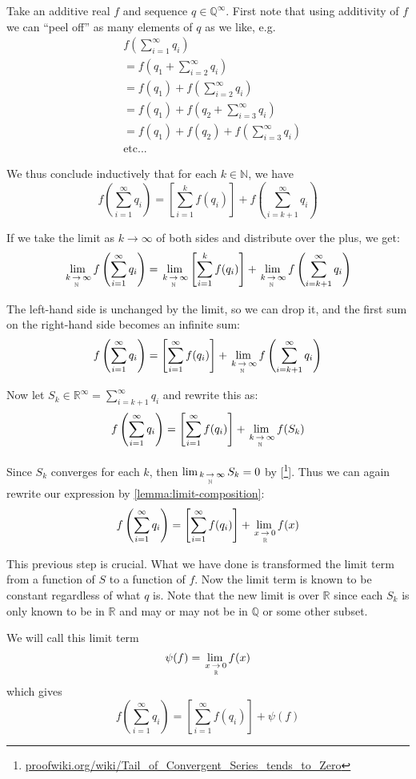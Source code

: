\documentclass{article}
\theoremstyle{mytheoremstyle}
\renewenvironment{proof}[1][\proofname]{\noindent{\bfseries #1. }}{\begin{flushright}\smiley\end{flushright}}
\newcommand{\R}{\mathbb R}
\newcommand{\N}{\mathbb Z}
\newcommand{\Q}{\mathbb Q}
\renewcommand{\N}{\mathbb N}
\begin{document}
\begin{proof}
Take an additive real $f$ and sequence $q \in \mathbb Q ^\infty$. First note that using additivity of $f$ we can ``peel off'' as many elements of $q$ as we like, e.g.
\begin{align*}
    & f\left( \sum_{i = 1}^\infty q_i \right) \\
    &= f\left( q_1 + \sum_{i = 2}^\infty q_i \right) \\
    &= f(q_1) + f\left( \sum_{i = 2}^\infty q_i \right) \\
    &= f(q_1) + f\left( q_2 + \sum_{i = 3}^\infty q_i \right) \\
    &= f(q_1) + f(q_2) + f\left( \sum_{i = 3}^\infty q_i \right) \\
    &\text{etc...}
\end{align*}

We thus conclude inductively that for each $k \in \mathbb N$, we have
$$ f\left( \sum_{i = 1}^\infty q_i \right) = \left[ \sum_{i=1}^k f(q_i) \right] + f\left( \sum_{i = k+1}^\infty q_i \right) $$

If we take the limit as $k \to \infty$ of both sides and distribute over the plus, we get:
$$ \limx{\N}{k}{\infty} f\left( \sum_{i = 1}^\infty q_i \right) = \limx{\N}{k}{\infty} \left[ \sum_{i=1}^k f(q_i) \right] + \limx{\N}{k}{\infty} f\left( \sum_{i = k+1}^\infty q_i \right) $$

The left-hand side is unchanged by the limit, so we can drop it, and the first sum on the right-hand side becomes an infinite sum:
$$ f\left( \sum_{i = 1}^\infty q_i \right) = \left[ \sum_{i=1}^\infty f(q_i) \right] + \limx{\N}{k}{\infty} f\left( \sum_{i = k+1}^\infty q_i \right) $$

Now let $S_k \in \mathbb R ^\infty = \sum_{i=k+1}^\infty q_i$ and rewrite this as:
$$ f\left( \sum_{i = 1}^\infty q_i \right) = \left[ \sum_{i=1}^\infty f(q_i) \right] + \limx{\N}{k}{\infty} f(S_k) $$

Since $S_k$ converges for each $k$, then $\limx{\N}{k}{\infty} S_k = 0$ by [\footnote{\url{proofwiki.org/wiki/Tail_of_Convergent_Series_tends_to_Zero}}]. Thus we can again rewrite our expression by \cref{lemma:limit-composition}:
$$ f\left( \sum_{i = 1}^\infty q_i \right) = \left[ \sum_{i=1}^\infty f(q_i) \right] + \limx{\R}{x}{0} f(x) $$

This previous step is crucial. What we have done is transformed the limit term from a function of $S$ to a function of $f$. Now the limit term is known to be constant regardless of what $q$ is. Note that the new limit is over $\R$ since each $S_k$ is only known to be in $\R$ and may or may not be in $\Q$ or some other subset.

We will call this limit term
$$ \psi(f) = \limx{\R}{x}{0} f(x) $$
which gives
$$ f\left( \sum_{i = 1}^\infty q_i \right) = \left[ \sum_{i=1}^\infty f(q_i) \right] + \psi(f) $$
\end{proof}
\end{document}
